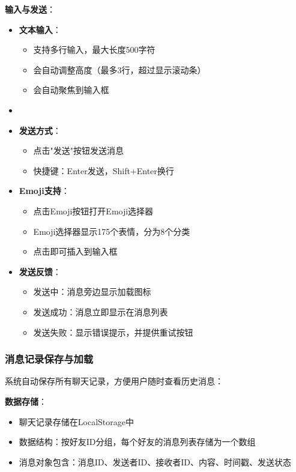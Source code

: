 \documentclass[12pt,a4paper]{article}
\begin{document}
\textbf{输入与发送}：
\begin{itemize}
    \item \textbf{文本输入}：
        \begin{itemize}
            \item 支持多行输入，最大长度500字符
            \item 会自动调整高度（最多3行，超过显示滚动条）
            \item 会自动聚焦到输入框
        \end{itemize}
    \item \item \textbf{发送方式}：
        \begin{itemize}
            \item 点击"发送"按钮发送消息
            \item 快捷键：Enter发送，Shift+Enter换行
        \end{itemize}
    \item \textbf{Emoji支持}：
        \begin{itemize}
            \item 点击Emoji按钮打开Emoji选择器
            \item Emoji选择器显示175个表情，分为8个分类
            \item 点击即可插入到输入框
        \end{itemize}
    \item \textbf{发送反馈}：
        \begin{itemize}
            \item 发送中：消息旁边显示加载图标
            \item 发送成功：消息立即显示在消息列表
            \item 发送失败：显示错误提示，并提供重试按钮
        \end{itemize}
\end{itemize}

\subsubsection{消息记录保存与加载}

系统自动保存所有聊天记录，方便用户随时查看历史消息：

\textbf{数据存储}：
\begin{itemize}
    \item 聊天记录存储在LocalStorage中
    \item 数据结构：按好友ID分组，每个好友的消息列表存储为一个数组
    \item 消息对象包含：消息ID、发送者ID、接收者ID、内容、时间戳、发送状态
\end{itemize}
\end{document}
